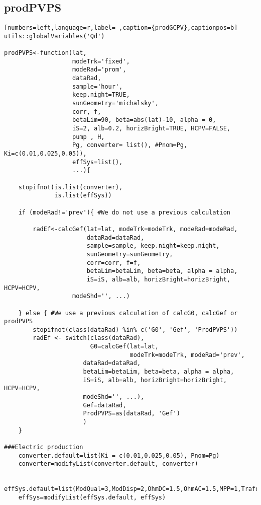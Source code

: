 \subsection{prodPVPS}
\label{sec:org1629038}
\label{subsec:prodpvps}
\begin{lstlisting}[numbers=left,language=r,label= ,caption={prodGCPV},captionpos=b]
utils::globalVariables('Qd')

prodPVPS<-function(lat, 
                   modeTrk='fixed', 
                   modeRad='prom', 
                   dataRad,
                   sample='hour',
                   keep.night=TRUE,
                   sunGeometry='michalsky',
                   corr, f,
                   betaLim=90, beta=abs(lat)-10, alpha = 0,
                   iS=2, alb=0.2, horizBright=TRUE, HCPV=FALSE,
                   pump , H, 
                   Pg, converter= list(), #Pnom=Pg, Ki=c(0.01,0.025,0.05)),
                   effSys=list(),
                   ...){

    stopifnot(is.list(converter),
              is.list(effSys))

    if (modeRad!='prev'){ #We do not use a previous calculation

        radEf<-calcGef(lat=lat, modeTrk=modeTrk, modeRad=modeRad,
                       dataRad=dataRad,
                       sample=sample, keep.night=keep.night,
                       sunGeometry=sunGeometry,
                       corr=corr, f=f,
                       betaLim=betaLim, beta=beta, alpha = alpha,
                       iS=iS, alb=alb, horizBright=horizBright, HCPV=HCPV,
                   modeShd='', ...)

    } else { #We use a previous calculation of calcG0, calcGef or prodPVPS
        stopifnot(class(dataRad) %in% c('G0', 'Gef', 'ProdPVPS'))
        radEf <- switch(class(dataRad),
                        G0=calcGef(lat=lat, 
                                   modeTrk=modeTrk, modeRad='prev',
                      dataRad=dataRad,
                      betaLim=betaLim, beta=beta, alpha = alpha,
                      iS=iS, alb=alb, horizBright=horizBright, HCPV=HCPV,
                      modeShd='', ...),
                      Gef=dataRad,
                      ProdPVPS=as(dataRad, 'Gef')
                      )
    }

###Electric production
    converter.default=list(Ki = c(0.01,0.025,0.05), Pnom=Pg)
    converter=modifyList(converter.default, converter)

    effSys.default=list(ModQual=3,ModDisp=2,OhmDC=1.5,OhmAC=1.5,MPP=1,TrafoMT=1,Disp=0.5)
    effSys=modifyList(effSys.default, effSys)


\end{lstlisting}
